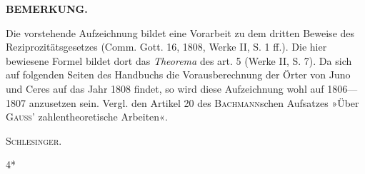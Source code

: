 \begin{center}\textbf{BEMERKUNG.}\end{center}
\small
\par\indent Die vorstehende Aufzeichnung bildet eine Vorarbeit zu dem dritten Beweise des Reziprozitätsgesetzes (Comm. Gott. 16, 1808, Werke II, S. 1 ff.). Die hier bewiesene Formel bildet dort das \textit{Theorema} des art. 5 (Werke II, S. 7). Da sich auf folgenden Seiten des Handbuchs die Vorausberechnung der Örter von Juno und Ceres auf das Jahr 1808 findet, so wird diese Aufzeichnung wohl auf 1806—1807 anzusetzen sein. Vergl. den Artikel 20 des \textsc{Bachmann}schen Aufsatzes »Über \textsc{Gauss}' zahlentheoretische Arbeiten«.
\begin{flushright}\textsc{Schlesinger.}\end{flushright}
\ClosingRule
\vfill\hfill 4*\par
\clearpage\endgroup
